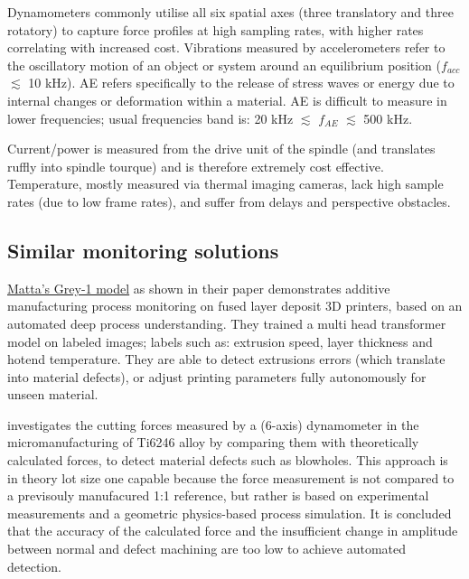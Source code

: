 \documentclass[5p,times,procedia]{elsarticle}
\begin{document}
\vspace*{-.5\baselineskip}
Dynamometers commonly utilise all six spatial axes (three translatory and three rotatory) to capture force profiles at high sampling rates, with higher rates correlating with increased cost.
Vibrations measured by accelerometers refer to the oscillatory motion of an object or system around an equilibrium position ($f_{acc}$ $\lesssim$ 10 kHz).
AE refers specifically to the release of stress waves or energy due to internal changes or deformation within a material. AE is difficult to measure in lower frequencies; usual frequencies band is: 20 kHz $\lesssim$ $f_{AE}$ $\lesssim$ 500 kHz. \cite{Jozwik.Mika2015, Sun.Hu.ea2020}

Current/power is measured from the drive unit of the spindle (and translates ruffly into spindle tourque) and is therefore extremely cost effective.
Temperature, mostly measured via thermal imaging cameras, lack high sample rates (due to low frame rates), and suffer from delays and perspective obstacles. 



\subsection{Similar monitoring solutions}
\vspace*{-\baselineskip}


\href{https://www.matta.ai/greymatta}{Matta's Grey-1 model} as shown in their paper \cite{Brion.Pattinson2022} demonstrates additive manufacturing process monitoring on fused layer deposit 3D printers, based on an automated deep process understanding. 
They trained a multi head transformer model on labeled images; labels such as: extrusion speed, layer thickness and hotend temperature. They are able to detect extrusions errors (which translate into material defects), or adjust printing parameters fully autonomously for unseen material. \cite{Brion.Pattinson2022}


\cite{Pfirrmann.Baumann.ea2021} investigates the cutting forces measured by a (6-axis) dynamometer in the micromanufacturing of Ti6246 alloy by comparing them with theoretically calculated forces, to detect material defects such as blowholes.
This approach is in theory lot size one capable because the force measurement is not compared to a previsouly manufacured 1:1 reference, but rather is based on experimental measurements and a geometric physics-based process simulation. 
It is concluded that the accuracy of the calculated force and the insufficient change in amplitude between normal and defect machining are too low to achieve automated detection. \cite[p.169]{Pfirrmann.Baumann.ea2021} 
\end{document}
